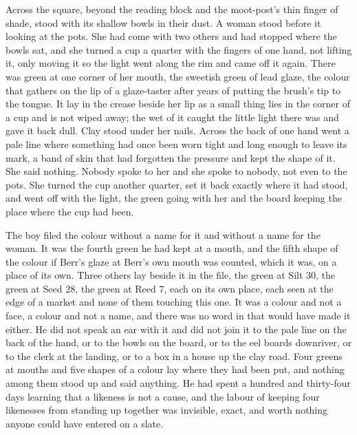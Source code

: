 Across the square, beyond the reading block and the moot-post's thin finger of shade,  stood with its shallow bowls in their dust. A woman stood before it looking at the pots. She had come with two others and had stopped where the bowls sat, and she turned a cup a quarter with the fingers of one hand, not lifting it, only moving it so the light went along the rim and came off it again. There was green at one corner of her mouth, the sweetish green of lead glaze, the colour that gathers on the lip of a glaze-taster after years of putting the brush's tip to the tongue. It lay in the crease beside her lip as a small thing lies in the corner of a cup and is not wiped away; the wet of it caught the little light there was and gave it back dull. Clay stood under her nails. Across the back of one hand went a pale line where something had once been worn tight and long enough to leave its mark, a band of skin that had forgotten the pressure and kept the shape of it. She said nothing. Nobody spoke to her and she spoke to nobody, not even to the pots. She turned the cup another quarter, set it back exactly where it had stood, and went off with the light, the green going with her and the board keeping the place where the cup had been.

The boy filed the colour without a name for it and without a name for the woman. It was the fourth green he had kept at a mouth, and the fifth shape of the colour if Berr's glaze at Berr's own mouth was counted, which it was, on a place of its own. Three others lay beside it in the file, the green at Silt 30, the green at Seed 28, the green at Reed 7, each on its own place, each seen at the edge of a market and none of them touching this one. It was a colour and not a face, a colour and not a name, and there was no word in  that would have made it either. He did not speak an ear with it and did not join it to the pale line on the back of the hand, or to the bowls on the board, or to the eel boards downriver, or to the clerk at the landing, or to a box in a house up the clay road. Four greens at mouths and five shapes of a colour lay where they had been put, and nothing among them stood up and said anything. He had spent a hundred and thirty-four days learning that a likeness is not a cause, and the labour of keeping four likenesses from standing up together was invisible, exact, and worth nothing anyone could have entered on a slate.

